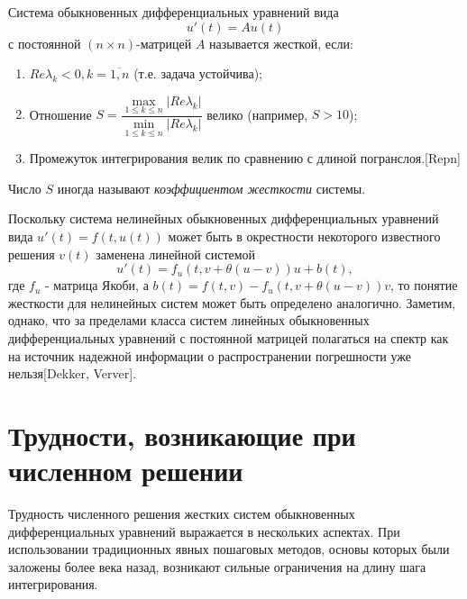 \documentclass[a4paper,14pt]{extreport}
\begin{document}
  
\begin{Definition}Система обыкновенных дифференциальных уравнений вида
  \begin{equation}
  \label{stiff:eq}
    u'(t)=Au(t)
  \end{equation}
  с постоянной $(n \times n)$-матрицей $ A $ называется жесткой, если: 
  \begin{enumerate}
  \item $Re\lambda _k <0, k=\overbar{1,n}$ (т.е. задача устойчива);
  \item Отношение $S = \dfrac{\max\limits_{1\leq k\leq n} |Re\lambda _k|}{\min\limits_{1\leq k\leq n} |Re\lambda _k|} $ велико (например, $S > 10$);
  \item Промежуток интегрирования велик по сравнению с длиной погранслоя.[Repn]
  \end{enumerate}
\end{Definition}

Число $S$ иногда называют \textit{коэффициентом жесткости} системы. 


Поскольку система нелинейных обыкновенных дифференциальных уравнений вида $u'(t)=f(t, u(t))$ может быть в окрестности некоторого известного решения $v(t)$ заменена линейной системой 
$$u'(t) = f_u (t, v + \theta (u-v))u + b(t), $$
где $f_u$ - матрица Якоби, а $b(t) = f(t, v)-f_u(t,v + \theta (u-v))v$, то понятие жесткости для нелинейных систем может быть определено аналогично. Заметим, однако, что за пределами класса систем линейных обыкновенных дифференциальных уравнений с постоянной матрицей полагаться на спектр как на источник надежной информации о распространении погрешности уже нельзя[Dekker, Verver].

  
  \section{Трудности, возникающие при численном решении}
  \label{s:stiff_troubles} Трудность численного решения жестких систем обыкновенных дифференциальных уравнений выражается в нескольких аспектах. При использовании традиционных явных пошаговых методов, основы которых были заложены более века назад, возникают сильные ограничения на длину шага интегрирования.
  
\end{document}
